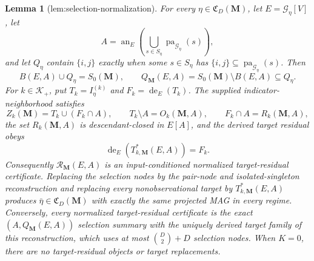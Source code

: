 \documentclass{article}
\newtheorem{lemma}{Lemma}
\begin{document}
\begin{lemma}[lem:selection-normalization]\label{lem:selection-normalization}
For every \(\eta\in\mathfrak C_D(\mathbf M)\), let \(E=\mathcal G_\eta[V]\), let
\[
A=\operatorname{an}_E\!\left(\bigcup_{s\in S_\eta}\operatorname{pa}_{\mathcal G_\eta}(s)\right),
\]
and let \(Q_\eta\) contain \(\{i,j\}\) exactly when some \(s\in S_\eta\) has \(\{i,j\}\subseteq\operatorname{pa}_{\mathcal G_\eta}(s)\).  Then
\[
B(E,A)\cup Q_\eta=S_0(\mathbf M),
\qquad
Q_{\mathbf M}(E,A)=S_0(\mathbf M)\setminus B(E,A)\subseteq Q_\eta.
\]
For \(k\in\mathcal K_+\), put \(T_k=I_\eta^{(k)}\) and \(F_k=\operatorname{de}_E(T_k)\).  The supplied indicator-neighborhood satisfies
\[
Z_k(\mathbf M)=T_k\cup(F_k\cap A),
\qquad
T_k\setminus A=O_k(\mathbf M,A),
\qquad
F_k\cap A=R_k(\mathbf M,A),
\]
the set \(R_k(\mathbf M,A)\) is descendant-closed in \(E[A]\), and the derived target residual obeys
\[
\operatorname{de}_E\!\left(T^*_{k,\mathbf M}(E,A)\right)=F_k.
\]
Consequently \(\mathcal R_{\mathbf M}(E,A)\) is an input-conditioned normalized target-residual certificate.  Replacing the selection nodes by the pair-node and isolated-singleton reconstruction and replacing every nonobservational target by \(T^*_{k,\mathbf M}(E,A)\) produces \(\bar\eta\in\mathfrak C_D(\mathbf M)\) with exactly the same projected MAG in every regime.  Conversely, every normalized target-residual certificate is the exact \((A,Q_{\mathbf M}(E,A))\) selection summary with the uniquely derived target family of this reconstruction, which uses at most \(\binom D2+D\) selection nodes.  When \(K=0\), there are no target-residual objects or target replacements.
\end{lemma}
\end{document}

